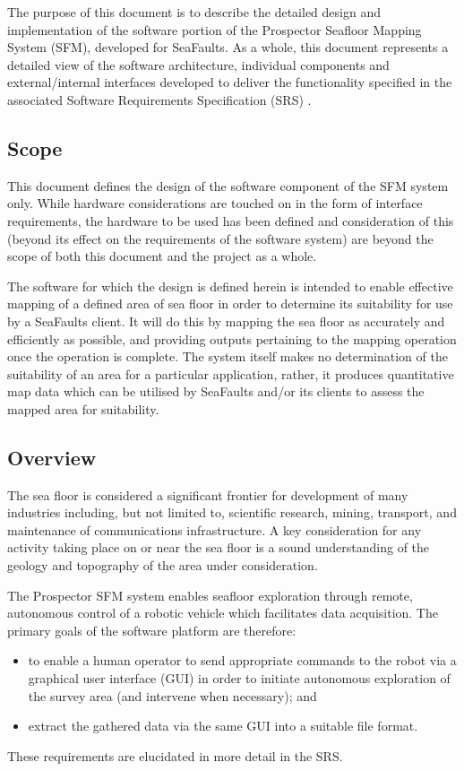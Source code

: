 \documentclass[12pt]{article}
\begin{document}
The purpose of this document is to describe the detailed design and implementation of the software portion of the Prospector Seafloor Mapping System (SFM), developed for SeaFaults. As a whole, this document represents a detailed view of the software architecture, individual components and external/internal interfaces developed to deliver the functionality specified in the associated Software Requirements Specification (SRS) \cite{srs}.

\subsection{Scope}
This document defines the design of the software component
of the SFM system only. While hardware considerations are touched
on in the form of interface requirements, the hardware to be
used has been defined and consideration of this (beyond its effect
on the requirements of the software system) are beyond the scope of
both this document and the project as a whole. 

The software for which the design is defined herein is intended
to enable effective mapping of a defined area of sea floor in order
to determine its suitability for use by a SeaFaults client. It will
do this by mapping the sea floor as accurately and efficiently as
possible, and providing outputs pertaining to the mapping operation
once the operation is complete. The system itself makes no determination
of the suitability of an area for a particular application, rather,
it produces quantitative map data which can be utilised by SeaFaults
and/or its clients to assess the mapped area for suitability.
 
\subsection{Overview}
The sea floor is considered a significant frontier for development
of many industries including, but not limited to, scientific research,
mining, transport, and maintenance of communications infrastructure. A key consideration
for any activity taking place on or near the sea floor is a sound
understanding of the geology and topography of the area under consideration. 

The Prospector SFM system enables seafloor exploration through remote, autonomous control of a robotic vehicle which facilitates data acquisition. The primary goals of the software platform are therefore:
\begin{itemize}
\item to enable a human operator to send appropriate commands to the robot via a graphical user interface (GUI) in order to initiate autonomous exploration of the survey area (and intervene when necessary); and 
\item extract the gathered data via the same GUI into a suitable file format.
\end{itemize}
These requirements are elucidated in more detail in the SRS.
\end{document}

